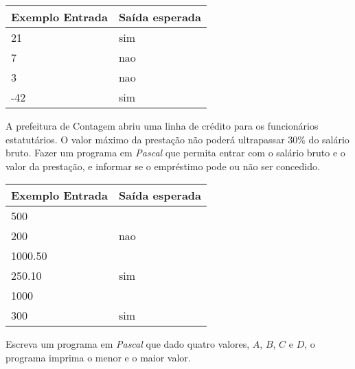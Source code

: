 \begin{center}
\begin{tabular}{|l|l|} \hline
Exemplo Entrada & Saída esperada \\ \hline
21               & sim               \\ \hline
7                & nao               \\ \hline
3                & nao               \\ \hline
-42              & sim               \\ \hline
\end{tabular}
\end{center}

\item A prefeitura de Contagem abriu uma linha de crédito para os funcionários 
estatutários. O valor máximo da prestação não poderá ultrapassar 30\% do 
salário bruto. Fazer um programa em \emph{Pascal} que permita entrar com o 
salário bruto e o valor da prestação, e informar se o empréstimo pode ou não 
ser concedido.

\begin{center}
\begin{tabular}{|l|l|} \hline
Exemplo Entrada & Saída esperada \\ \hline
500                &                \\
200                & nao               \\ \hline
1000.50                &                \\
250.10                & sim               \\ \hline
1000                &                \\
300                & sim               \\ \hline
\end{tabular}
\end{center}

\item Escreva um programa em \emph{Pascal} que dado quatro valores, 
$A$, $B$, $C$ e $D$, o programa imprima o menor e o maior valor.

